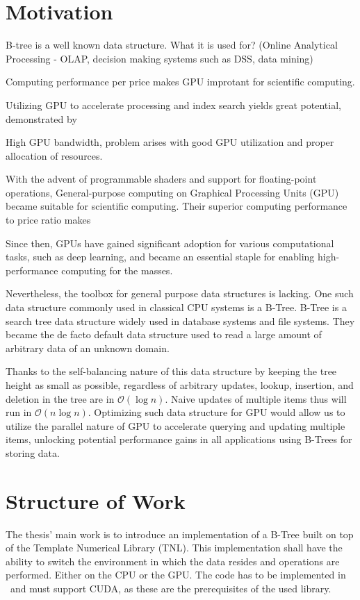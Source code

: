 \section{Motivation}

B-tree is a well known data structure. What it is used for? (Online Analytical Processing - OLAP, decision making systems such as DSS, data mining)

Computing performance per price makes GPU improtant for scientific computing.

Utilizing GPU to accelerate processing and index search yields great potential, demonstrated by 

High GPU bandwidth, problem arises with good GPU utilization and proper allocation of resources.



With the advent of programmable shaders and support for floating-point operations, General-purpose computing on Graphical Processing Units (GPU) became suitable for scientific computing. Their superior computing performance to price ratio makes 

Since then, GPUs have gained significant adoption for various computational tasks, such as deep learning, and became an essential staple for enabling high-performance computing for the masses.

Nevertheless, the toolbox for general purpose data structures is lacking. One such data structure commonly used in classical CPU systems is a B-Tree. B-Tree is a search tree data structure widely used in database systems and file systems. They became the de facto default data structure used to read a large amount of arbitrary data of an unknown domain.

Thanks to the self-balancing nature of this data structure by keeping the tree height as small as possible, regardless of arbitrary updates, lookup, insertion, and deletion in the tree are in $\mathcal{O}(\log{n})$. Naive updates of multiple items thus will run in $\mathcal{O}(n \log{n})$. Optimizing such data structure for GPU would allow us to utilize the parallel nature of GPU to accelerate querying and updating multiple items, unlocking potential performance gains in all applications using B-Trees for storing data.

\section{Structure of Work}

The thesis' main work is to introduce an implementation of a B-Tree built on top of the Template Numerical Library (TNL). This implementation shall have the ability to switch the environment in which the data resides and operations are performed. Either on the CPU or the GPU. The code has to be implemented in \CC\ and must support CUDA, as these are the prerequisites of the used library.

